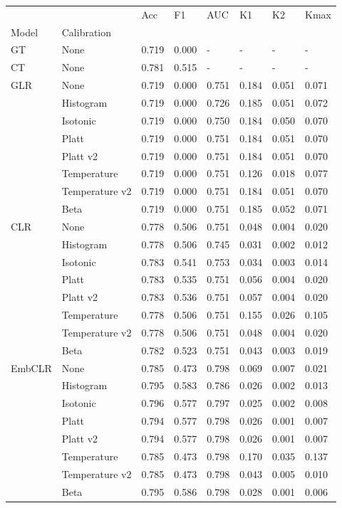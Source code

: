 \begin{tabular}{llllllll}
\toprule
 &  & Acc & F1 & AUC & K1 & K2 & Kmax \\
Model & Calibration &  &  &  &  &  &  \\
\midrule
GT & None & 0.719 & 0.000 & - & - & - & - \\
\cline{1-8}
CT & None & 0.781 & 0.515 & - & - & - & - \\
\cline{1-8}
\multirow[t]{8}{*}{GLR} & None & 0.719 & 0.000 & 0.751 & 0.184 & 0.051 & 0.071 \\
 & Histogram & 0.719 & 0.000 & 0.726 & 0.185 & 0.051 & 0.072 \\
 & Isotonic & 0.719 & 0.000 & 0.750 & 0.184 & 0.050 & 0.070 \\
 & Platt & 0.719 & 0.000 & 0.751 & 0.184 & 0.051 & 0.070 \\
 & Platt v2 & 0.719 & 0.000 & 0.751 & 0.184 & 0.051 & 0.070 \\
 & Temperature & 0.719 & 0.000 & 0.751 & 0.126 & 0.018 & 0.077 \\
 & Temperature v2 & 0.719 & 0.000 & 0.751 & 0.184 & 0.051 & 0.070 \\
 & Beta & 0.719 & 0.000 & 0.751 & 0.185 & 0.052 & 0.071 \\
\cline{1-8}
\multirow[t]{8}{*}{CLR} & None & 0.778 & 0.506 & 0.751 & 0.048 & 0.004 & 0.020 \\
 & Histogram & 0.778 & 0.506 & 0.745 & 0.031 & 0.002 & 0.012 \\
 & Isotonic & 0.783 & 0.541 & 0.753 & 0.034 & 0.003 & 0.014 \\
 & Platt & 0.783 & 0.535 & 0.751 & 0.056 & 0.004 & 0.020 \\
 & Platt v2 & 0.783 & 0.536 & 0.751 & 0.057 & 0.004 & 0.020 \\
 & Temperature & 0.778 & 0.506 & 0.751 & 0.155 & 0.026 & 0.105 \\
 & Temperature v2 & 0.778 & 0.506 & 0.751 & 0.048 & 0.004 & 0.020 \\
 & Beta & 0.782 & 0.523 & 0.751 & 0.043 & 0.003 & 0.019 \\
\cline{1-8}
\multirow[t]{8}{*}{EmbCLR} & None & 0.785 & 0.473 & 0.798 & 0.069 & 0.007 & 0.021 \\
 & Histogram & 0.795 & 0.583 & 0.786 & 0.026 & 0.002 & 0.013 \\
 & Isotonic & 0.796 & 0.577 & 0.797 & 0.025 & 0.002 & 0.008 \\
 & Platt & 0.794 & 0.577 & 0.798 & 0.026 & 0.001 & 0.007 \\
 & Platt v2 & 0.794 & 0.577 & 0.798 & 0.026 & 0.001 & 0.007 \\
 & Temperature & 0.785 & 0.473 & 0.798 & 0.170 & 0.035 & 0.137 \\
 & Temperature v2 & 0.785 & 0.473 & 0.798 & 0.043 & 0.005 & 0.010 \\
 & Beta & 0.795 & 0.586 & 0.798 & 0.028 & 0.001 & 0.006 \\
\cline{1-8}
\bottomrule
\end{tabular}
